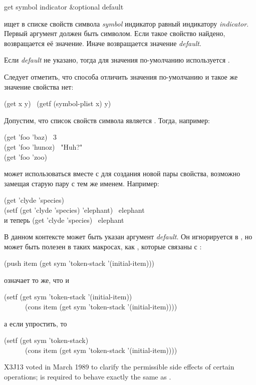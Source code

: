 \begin{defun}[Функция]
get symbol indicator &optional default

 ищет в списке свойств символа \emph{symbol} индикатор равный 
индикатору \emph{indicator}.
Первый аргумент должен быть символом.
Если такое свойство найдено, возвращается её значение. Иначе возвращается
значение \emph{default}.

Если \emph{default} не указано, тогда для значения по-умолчанию используется
{\false}.

Следует отметить, что способа отличить значения по-умолчанию и такое же значение
свойства нет:
\begin{lisp}
(get x y) \EQ\ (getf (symbol-plist x) y)
\end{lisp}
Допустим, что список свойств символа  является .
Тогда, например:
\begin{lisp}
(get 'foo 'baz) \EV\ 3 \\
(get 'foo 'hunoz) \EV\ "Huh?" \\
(get 'foo 'zoo) \EV\ {\false}
\end{lisp}

 может использоваться вместе с  для создания новой пары
свойства, возможно замещая старую пару с тем же именем.
Например:
\begin{lisp}
(get 'clyde 'species) \EV\ {\false} \\
(setf (get 'clyde 'species) 'elephant) \EV\ elephant \\
\textrm{и теперь} (get 'clyde 'species) \EV\ elephant
\end{lisp}
В данном контексте может быть указан аргумент \emph{default}. Он игнорируется в
, но может быть полезен в таких макросах, как , которые
связаны с :
\begin{lisp}
(push item (get sym 'token-stack '(initial-item)))
\end{lisp}
означает то же, что и
\begin{lisp}
(setf (get sym 'token-stack '(initial-item)) \\
~~~~~~(cons item (get sym 'token-stack '(initial-item))))
\end{lisp}
а если упростить, то
\begin{lisp}
(setf (get sym 'token-stack) \\
~~~~~~(cons item (get sym 'token-stack '(initial-item))))
\end{lisp}

\begin{newer}
X3J13 voted in March 1989 
to clarify the permissible side effects of certain operations;
is required to behave exactly the same as
.
\end{newer}
\end{defun}

